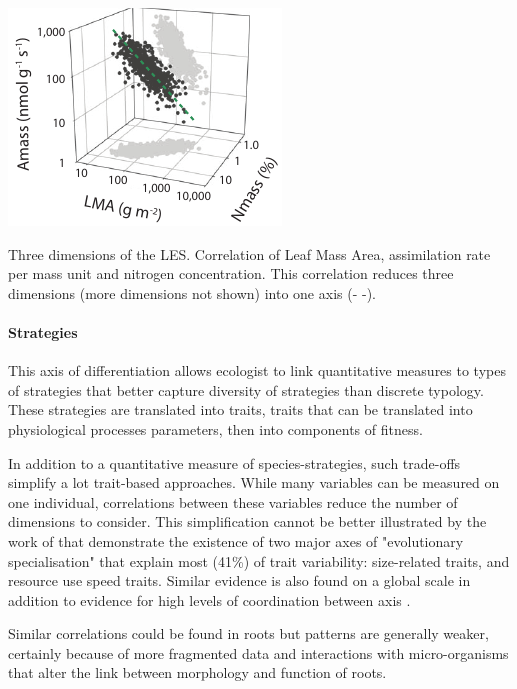 \begin{marginfigure}
    \includegraphics{./Figures/LES1_m.pdf}
  \caption[Leaf Economic Spectrum]{Three dimensions of the LES. Correlation of Leaf Mass Area, assimilation rate per mass unit and nitrogen concentration. This correlation reduces three dimensions (more dimensions not shown) into one axis (\textcolor{myGreen}{- -}).}
  \label{fg:insurance}
\end{marginfigure}

\paragraph{Strategies}
This axis of differentiation allows ecologist to link quantitative measures to types of strategies that better capture diversity of strategies than discrete typology. These strategies are translated into traits, traits that can be translated into physiological processes parameters, then into components of fitness.

In addition to a quantitative measure of species-strategies, such trade-offs simplify a lot trait-based approaches. While many variables can be measured on one individual, correlations between these variables reduce the number of dimensions to consider. This simplification cannot be better illustrated by the work of \cite{diaz_plant_2004} that demonstrate the existence of two major axes of "evolutionary specialisation" that explain most (41\%) of trait variability: size-related traits, and resource use speed traits. Similar evidence is also found on a global scale in addition to evidence for high levels of coordination between axis \parencite{diaz_global_2016}.


Similar correlations could be found in roots \cite{ ryser_importance_1996, reich_world-wide_2014} but patterns are generally weaker, certainly because of more fragmented data and interactions with micro-organisms that alter the link between morphology and function of roots.


